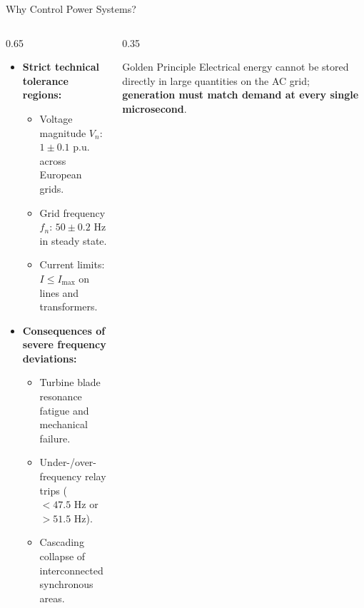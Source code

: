 \begin{frame}{Why Control Power Systems?}
\begin{columns}[T]
\begin{column}{0.65\textwidth}
  \begin{itemize}\setlength{\itemsep}{2pt}
      \item \textbf{Strict technical tolerance regions:}
      \begin{itemize}
        \item Voltage magnitude $V_n$: $1 \pm 0.1\text{ p.u.}$ across European grids.
        \item \alert{Grid frequency $f_n$: $50 \pm 0.2\text{ Hz}$ in steady state.}
        \item Current limits: $I \le I_{\max}$ on lines and transformers.
      \end{itemize} 
      \item \textbf{Consequences of severe frequency deviations:}
      \begin{itemize}
        \item Turbine blade resonance fatigue and mechanical failure.
        \item Under-/over-frequency relay trips ($< 47.5\text{ Hz}$ or $> 51.5\text{ Hz}$).
        \item Cascading collapse of interconnected synchronous areas.
      \end{itemize}
  \end{itemize}
\end{column}
\begin{column}{0.35\textwidth}
    \begin{block}{Golden Principle}
    \scriptsize
    Electrical energy cannot be stored directly in large quantities on the AC grid; \textbf{generation must match demand at every single microsecond}.
    \end{block}
\end{column}
\end{columns}
\end{frame}

